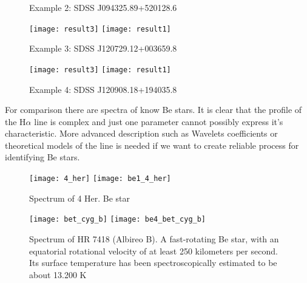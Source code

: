 \begin{figure}[!htbp]
\begin{center}
        \fi
        \caption{Example 2: SDSS J094325.89+520128.6}
        \label{FigResult2}
      \end{center}
    \end{figure}

   \begin{figure}[!htbp]
      \begin{center}
        \leavevmode
        \ifpdf
        \texttt{[image: result3]}
        \else
        \texttt{[image: result1]}
        \fi
        \caption{Example 3: SDSS J120729.12+003659.8}
        \label{FigResult3}
      \end{center}
    \end{figure}

   \begin{figure}[!htbp]
      \begin{center}
        \leavevmode
        \ifpdf
        \texttt{[image: result3]}
        \else
        \texttt{[image: result1]}
        \fi
        \caption{Example 4: SDSS J120908.18+194035.8 }
        \label{FigResult3}
      \end{center}
    \end{figure}

 
    For comparison there are spectra of know Be stars. It is clear
    that the profile of the H$\alpha$ line is complex and just one
    parameter cannot possibly express it's characteristic. More
    advanced description such as Wavelets coefficients or theoretical
    models of the line is needed if we want to create reliable
    process for identifying Be stars.

   \begin{figure}[!htbp]
      \begin{center}
        \leavevmode
        \ifpdf
        \texttt{[image: 4\_her]}
        \else
        \texttt{[image: be1\_4\_her]}
        \fi
        \caption{Spectrum of 4 Her. Be star}
        \label{FigBe1}
      \end{center}
    \end{figure}

   \begin{figure}[!htbp]
      \begin{center}
        \leavevmode
        \ifpdf
        \texttt{[image: bet\_cyg\_b]}
        \else
        \texttt{[image: be4\_bet\_cyg\_b]}
        \fi
        \caption{Spectrum of HR 7418 (Albireo B). A fast-rotating Be
          star, with an equatorial rotational velocity of at least 250
          kilometers per second. Its surface temperature has been
          spectroscopically estimated to be about 13.200 K }
        \label{FigBe4}
      \end{center}
    \end{figure}

